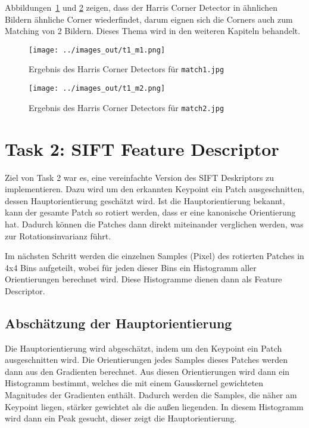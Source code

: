 Abbildungen~\ref{fig:t1_m1} und \ref{fig:t1_m2} zeigen, dass der Harris Corner Detector in ähnlichen Bildern ähnliche Corner wiederfindet, darum eignen sich die Corners auch zum Matching von 2 Bildern. Dieses Thema wird in den weiteren Kapiteln behandelt.

\begin{figure}[htb]
 \centering
 \texttt{[image: ../images\_out/t1\_m1.png]}
 \caption{Ergebnis des Harris Corner Detectors für \texttt{match1.jpg}}
 \label{fig:t1_m1}
\end{figure}

\begin{figure}[htb]
 \centering
 \texttt{[image: ../images\_out/t1\_m2.png]}
 \caption{Ergebnis des Harris Corner Detectors für \texttt{match2.jpg}}
 \label{fig:t1_m2}
\end{figure}

\clearpage



\chapter{Task 2: SIFT Feature Descriptor}

Ziel von Task 2 war es, eine vereinfachte Version des SIFT Deskriptors zu implementieren. Dazu wird um den erkannten Keypoint ein Patch ausgeschnitten, dessen Hauptorientierung geschätzt wird. Ist die Hauptorientierung bekannt, kann der gesamte Patch so rotiert werden, dass er eine kanonische Orientierung hat. Dadurch können die Patches dann direkt miteinander verglichen werden, was zur Rotationsinvarianz führt.

Im nächsten Schritt werden die einzelnen Samples (Pixel) des rotierten Patches in 4x4 Bins aufgeteilt, wobei für jeden dieser Bins ein Histogramm aller Orientierungen berechnet wird. Diese Histogramme dienen dann als Feature Descriptor.


\section{Abschätzung der Hauptorientierung}

Die Hauptorientierung wird abgeschätzt, indem um den Keypoint ein Patch ausgeschnitten wird. Die Orientierungen jedes Samples dieses Patches werden dann aus den Gradienten berechnet. Aus diesen Orientierungen wird dann ein Histogramm bestimmt, welches die mit einem Gausskernel gewichteten Magnitudes der Gradienten enthält. Dadurch werden die Samples, die näher am Keypoint liegen, stärker gewichtet als die außen liegenden. In diesem Histogramm wird dann ein Peak gesucht, dieser zeigt die Hauptorientierung.


